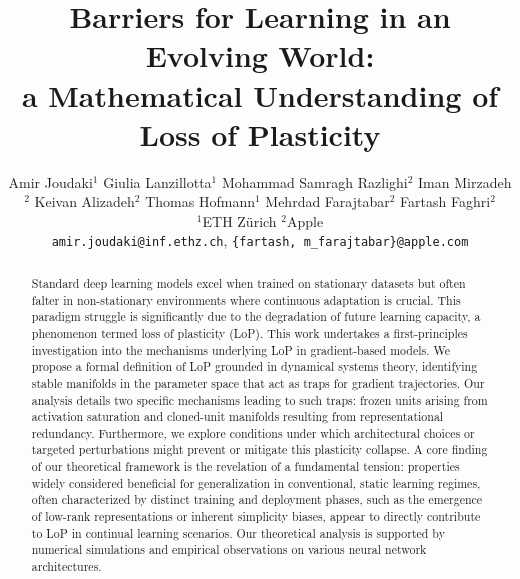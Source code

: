 \documentclass{article}
\title{Barriers for Learning in an Evolving World: \\a Mathematical Understanding of Loss of Plasticity}
\author{%
  Amir Joudaki$^{1}$ \And
  Giulia Lanzillotta$^{1}$ \And
  Mohammad Samragh Razlighi$^{2}$ \And
  Iman Mirzadeh$^{2}$ \And
  Keivan Alizadeh$^{2}$ \And
  Thomas Hofmann$^{1}$ \And
  Mehrdad Farajtabar$^{2}$ \And
  Fartash Faghri$^{2}$ %
  \\
  $^{1}$ETH Zürich \quad
  $^{2}$Apple \\
  \texttt{amir.joudaki@inf.ethz.ch},
  \texttt{\{fartash, m\_farajtabar\}@apple.com}
}
\newcommand{\GIU}[1]{\todo[color=purple!30,size=\tiny]{GIU: #1}}
\numberwithin{figure}{section}
\begin{document}
\maketitle

\begin{abstract}
    Standard deep learning models excel when trained on stationary datasets but often falter in non-stationary environments where continuous adaptation is crucial. This paradigm struggle is significantly due to the degradation of future learning capacity, a phenomenon termed loss of plasticity (LoP). This work undertakes a first-principles investigation into the mechanisms underlying LoP in gradient-based models. We propose a formal definition of LoP grounded in dynamical systems theory, identifying stable manifolds in the parameter space that act as traps for gradient trajectories. Our analysis details two specific mechanisms leading to such traps: frozen units arising from activation saturation and cloned-unit manifolds resulting from representational redundancy. Furthermore, we explore conditions under which architectural choices or targeted perturbations might prevent or mitigate this plasticity collapse.
    A core finding of our theoretical framework is the revelation of a fundamental tension: properties widely considered beneficial for generalization in conventional, static learning regimes, often characterized by distinct training and deployment phases, such as the emergence of low-rank representations or inherent simplicity biases, appear to directly contribute to LoP in continual learning scenarios.
    Our theoretical analysis is supported by numerical simulations and empirical observations on various neural network architectures.
\end{abstract}
\end{document}
